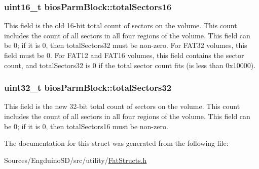 \subsubsection[{total\+Sectors16}]{\setlength{\rightskip}{0pt plus 5cm}uint16\+\_\+t bios\+Parm\+Block\+::total\+Sectors16}\label{structbios_parm_block_a686c686fde2fb109bea120f2f434db87}
This field is the old 16-\/bit total count of sectors on the volume. This count includes the count of all sectors in all four regions of the volume. This field can be 0; if it is 0, then total\+Sectors32 must be non-\/zero. For F\+A\+T32 volumes, this field must be 0. For F\+A\+T12 and F\+A\+T16 volumes, this field contains the sector count, and total\+Sectors32 is 0 if the total sector count fits (is less than 0x10000). \hypertarget{structbios_parm_block_abead42e130c40e2aa535202e7cb07578}{}
\subsubsection[{total\+Sectors32}]{\setlength{\rightskip}{0pt plus 5cm}uint32\+\_\+t bios\+Parm\+Block\+::total\+Sectors32}\label{structbios_parm_block_abead42e130c40e2aa535202e7cb07578}
This field is the new 32-\/bit total count of sectors on the volume. This count includes the count of all sectors in all four regions of the volume. This field can be 0; if it is 0, then total\+Sectors16 must be non-\/zero. 

The documentation for this struct was generated from the following file\+:\begin{DoxyCompactItemize}
\item 
Sources/\+Engduino\+S\+D/src/utility/\hyperlink{_fat_structs_8h}{Fat\+Structs.\+h}\end{DoxyCompactItemize}
